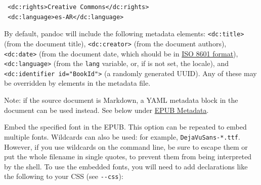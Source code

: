 \documentclass[
  b5paper
]{book}
\begin{document}
\begin{description}
\begin{verbatim}
 <dc:rights>Creative Commons</dc:rights>
 <dc:language>es-AR</dc:language>
\end{verbatim}

By default, pandoc will include the following metadata elements:
\texttt{\textless{}dc:title\textgreater{}} (from the document title),
\texttt{\textless{}dc:creator\textgreater{}} (from the document
authors), \texttt{\textless{}dc:date\textgreater{}} (from the document
date, which should be in \href{https://www.w3.org/TR/NOTE-datetime}{ISO
8601 format}), \texttt{\textless{}dc:language\textgreater{}} (from the
\texttt{lang} variable, or, if is not set, the locale), and
\texttt{\textless{}dc:identifier\ id="BookId"\textgreater{}} (a randomly
generated UUID). Any of these may be overridden by elements in the
metadata file.

Note: if the source document is Markdown, a YAML metadata block in the
document can be used instead. See below under
\hyperref[epub-metadata]{EPUB Metadata}.
\item[\texttt{-\/-epub-embed-font=}\emph{FILE}]
Embed the specified font in the EPUB. This option can be repeated to
embed multiple fonts. Wildcards can also be used: for example,
\texttt{DejaVuSans-*.ttf}. However, if you use wildcards on the command
line, be sure to escape them or put the whole filename in single quotes,
to prevent them from being interpreted by the shell. To use the embedded
fonts, you will need to add declarations like the following to your CSS
(see \texttt{-\/-css}):


\end{description}
\end{document}
